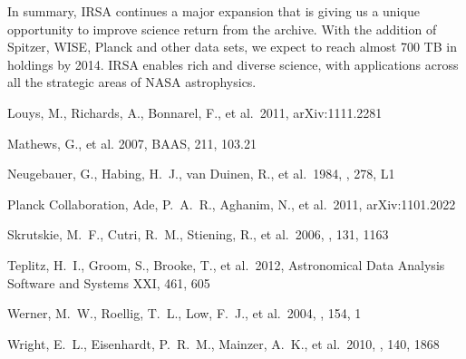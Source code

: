 \documentclass[11pt,twoside]{article}
\begin{document}
In summary, IRSA continues a major expansion that is giving us a
unique opportunity to improve science return from the archive.  With
the addition of Spitzer, WISE, Planck and other data sets, we expect
to reach almost 700 TB in holdings by 2014.  IRSA enables rich and
diverse science, with applications across all the strategic areas of
NASA astrophysics.  

\bigskip

\noindent Louys, M., Richards, A., 
Bonnarel, F., et al.\ 2011, arXiv:1111.2281 

\noindent Mathews, G., et al. 2007, BAAS, 211, 103.21

\noindent Neugebauer, G., 
Habing, H.~J., van Duinen, R., et al.\ 1984, \apjl, 278, L1 

\noindent Planck 
Collaboration, Ade, P.~A.~R., Aghanim, N., et al.\ 2011, arXiv:1101.2022 

\noindent Skrutskie, M.~F., 
Cutri, R.~M., Stiening, R., et al.\ 2006, \aj, 131, 1163 

\noindent Teplitz, H.~I., Groom, 
S., Brooke, T., et al.\ 2012, Astronomical Data Analysis Software and 
Systems XXI, 461, 605 

\noindent Werner, M.~W., Roellig, 
T.~L., Low, F.~J., et al.\ 2004, \apjs, 154, 1 

\noindent \noindent Wright, E.~L., 
Eisenhardt, P.~R.~M., Mainzer, A.~K., et al.\ 2010, \aj, 140, 1868 
\end{document}
